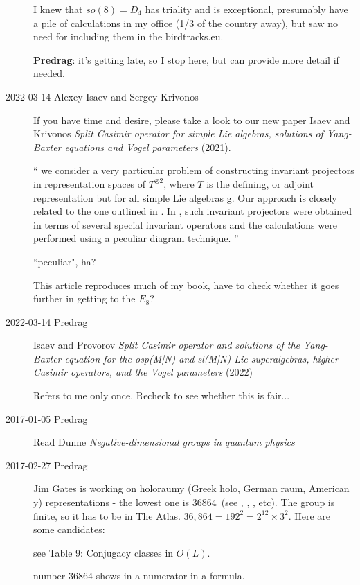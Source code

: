 \begin{description}
I knew that $so(8)=D_4$ has triality and is exceptional, presumably have
a pile of calculations in my office (1/3 of the country away), but saw no
need for including them in the birdtracks.eu.

{\bf Predrag}: it's getting late, so I stop here, but can provide more
detail if needed.

\item[2022-03-14 Alexey Isaev and Sergey Krivonos]
If you have time and desire, please take a look to our new paper
Isaev and Krivonos
{\em Split Casimir operator for simple Lie algebras, 
solutions of {Yang-Baxter} equations and {Vogel} parameters}
(2021).

``
we consider a very particular problem of constructing invariant
projectors in representation spaces of $T^{\otimes2}$, where $T$ is the
defining, or adjoint representation but for all simple Lie algebras g.
Our approach is closely related to the one outlined in . In
, such invariant projectors were obtained in terms of
several special invariant operators and the calculations were performed
using a peculiar diagram technique.
''

``peculiar", ha?

This article reproduces much of my book, have to check whether it goes further
in getting to the $E_8$?


\item[2022-03-14 Predrag]
Isaev and Provorov
{\em Split {Casimir} operator and solutions of the {Yang-Baxter} equation
for the {osp(M|N) and sl(M|N) Lie} superalgebras, higher {Casimir}
operators, and the {Vogel} parameters}
(2022)

Refers to me only once. Recheck to see whether this is fair...


\item[2017-01-05 Predrag]
Read Dunne
{\em Negative-dimensional groups in quantum physics}

\item[2017-02-27 Predrag]
Jim Gates is working on holoraumy (Greek holo, German raum, American y)
representations - the lowest one is 36864\dmn\ (see ,
, , etc). The group is finite, so it
has to be in The Atlas. $36,864=192^2=2^{12}\times3^2$.
Here are some candidates:

 see Table 9: Conjugacy classes in $O(L)$.

  number 36864 shows in a numerator in a formula.


\end{description}
